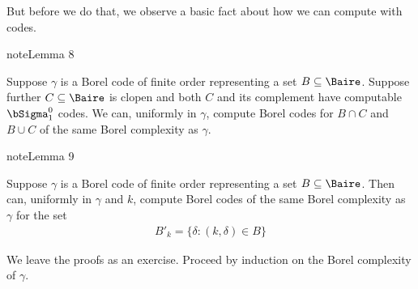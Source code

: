 \documentclass[letterpaper,10pt,english]{jupyterBook}
\begin{document}
\sphinxAtStartPar
But before we do that, we observe a basic fact about how we can compute with codes.
\label{codingBorel:lem-Borel-codes-clopen}
\begin{sphinxadmonition}{note}{Lemma 8}



\sphinxAtStartPar
Suppose \(\gamma\) is a Borel code of finite order representing a set \(B \subseteq \Baire\). Suppose further \(C \subseteq \Baire\) is clopen and both \(C\) and its complement have computable \(\bSigma^0_1\) codes. We can, uniformly in \(\gamma\), compute Borel codes for \(B \cap C\) and \(B \cup C\) of the same Borel complexity as \(\gamma\).
\end{sphinxadmonition}
\label{codingBorel:lem-Borel-codes-shift}
\begin{sphinxadmonition}{note}{Lemma 9}



\sphinxAtStartPar
Suppose \(\gamma\) is a Borel code of finite order representing a set \(B \subseteq \Baire\). Then can, uniformly in \(\gamma\) and \(k\), compute Borel codes of the same Borel complexity as \(\gamma\) for the set
\begin{equation*}
\begin{split}
B'_k = \{ \delta \colon (k, \delta) \in B\}
\end{split}
\end{equation*}\end{sphinxadmonition}

\sphinxAtStartPar
We leave the proofs as an exercise. Proceed by induction on the Borel complexity of \(\gamma\).
\end{document}
